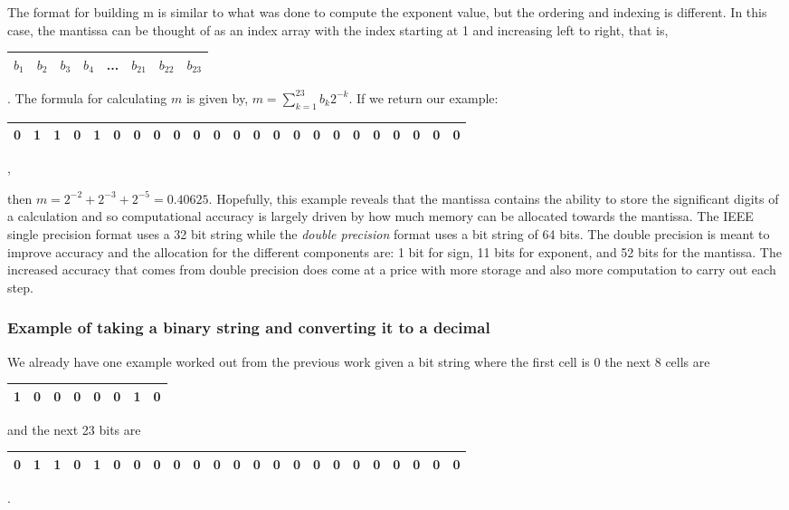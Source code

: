 \documentclass[twoside]{article}
\def\ds{\displaystyle}
\begin{document}
The format for building m is similar to what was done to compute the exponent value, but the ordering and indexing is different. In this case, the mantissa can be thought of as an index array with the index starting at 1 and increasing left to right, that is,
\begin{tabular}{|c|c|c|c|c|c|c|c|}
\hline
$b_1$  & $b_2$  & $b_3$  &  $b_4$  & ... & $b_{21}$ & $b_{22}$  &  $b_{23}$ \\
\hline
\end{tabular}. The formula for calculating $m$ is given by, $\ds m=\sum_{k=1}^{23}b_k2^{-k}$. If we return our example: 

\begin{tabular}{|c|c|c|c|c|c|c|c|c|c|c|c|c|c|c|c|c|c|c|c|c|c|c|}
\hline
0 & 1 & 1 & 0 & 1 & 0 & 0 & 0 & 0 & 0 &  0 & 0& 0  & 0 & 0 & 0 & 0 & 0 & 0 & 0 & 0 & 0 & 0\\
\hline
\end{tabular},

then $m=2^{-2} + 2^{-3} + 2^{-5} = 0.40625$. Hopefully, this example reveals that the mantissa contains the ability to store the significant digits of a calculation and so computational accuracy is largely driven by how much memory can be allocated towards the mantissa. The IEEE single precision format uses a 32 bit string while the {\it double precision} format uses a bit string of 64 bits. The double precision is meant to improve accuracy and the allocation for the different components are: 1 bit for sign, 11 bits for exponent, and 52 bits for the mantissa. The increased accuracy that comes from double precision does come at a price with more storage and also more computation to carry out each step. 
\subsubsection{Example of taking a binary string and converting it to a decimal}
We already have one example worked out from the previous work given a bit string where the first cell is 0 the next 8 cells are

\begin{tabular}{|c|c|c|c|c|c|c|c|}
\hline
1 & 0 & 0 & 0 & 0 & 0 & 1 & 0\\
\hline
\end{tabular}

and the next 23 bits are

\begin{tabular}{|c|c|c|c|c|c|c|c|c|c|c|c|c|c|c|c|c|c|c|c|c|c|c|}
\hline
0 & 1 & 1 & 0 & 1 & 0 & 0 & 0 & 0 & 0 &  0 & 0& 0  & 0 & 0 & 0 & 0 & 0 & 0 & 0 & 0 & 0 & 0\\
\hline
\end{tabular}.
\end{document}
